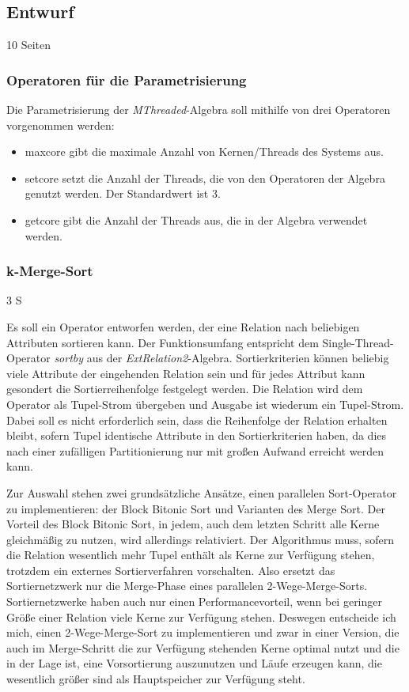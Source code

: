 \documentclass[a4paper,12pt,twoside]{article}
\newcommand{\Fb}[1]{\textit{#1}} %
\begin{document}
{\subsection{Entwurf} 10 Seiten
\label{Entwicklung} 

\subsubsection{Operatoren für die Parametrisierung}

Die Parametrisierung der \Fb{MThreaded}-Algebra soll mithilfe von drei Operatoren vorgenommen werden:

\begin{itemize}
	\item maxcore gibt die maximale Anzahl von Kernen/Threads des Systems aus.
	\item setcore setzt die Anzahl der Threads, die von den Operatoren der Algebra genutzt werden. Der Standardwert ist 3.
	\item getcore gibt die Anzahl der Threads aus, die in der Algebra verwendet werden.
\end{itemize}

\subsubsection{k-Merge-Sort} 3 S
\label{entw:sort}

Es soll ein Operator entworfen werden, der eine Relation nach beliebigen Attributen sortieren kann. Der Funktionsumfang entspricht dem Single-Thread-Operator \Fb{sortby} aus der \Fb{ExtRelation2}-Algebra. Sortierkriterien können beliebig viele Attribute der eingehenden Relation sein und für jedes Attribut kann gesondert die Sortierreihenfolge festgelegt werden. Die Relation wird dem Operator als Tupel-Strom übergeben und Ausgabe ist wiederum ein Tupel-Strom. Dabei soll es nicht erforderlich sein, dass die Reihenfolge der Relation erhalten bleibt, sofern Tupel identische Attribute in den Sortierkriterien haben, da dies nach einer zufälligen Partitionierung nur mit großen Aufwand erreicht werden kann.

Zur Auswahl stehen zwei grundsätzliche Ansätze, einen parallelen Sort-Operator zu implementieren: der Block Bitonic Sort und Varianten des Merge Sort. Der Vorteil des Block Bitonic Sort, in jedem, auch dem letzten Schritt alle Kerne gleichmäßig zu nutzen, wird allerdings relativiert. Der Algorithmus muss, sofern die Relation wesentlich mehr Tupel enthält als Kerne zur Verfügung stehen, trotzdem ein externes Sortierverfahren vorschalten. Also ersetzt das Sortiernetzwerk nur die Merge-Phase eines parallelen 2-Wege-Merge-Sorts. Sortiernetzwerke haben auch nur einen Performancevorteil, wenn bei geringer Größe einer Relation viele Kerne zur Verfügung stehen. Deswegen entscheide ich mich, einen 2-Wege-Merge-Sort zu implementieren und zwar in einer Version, die auch im Merge-Schritt die zur Verfügung stehenden Kerne optimal nutzt und die in der Lage ist, eine Vorsortierung auszunutzen und Läufe erzeugen kann, die wesentlich größer sind als Hauptspeicher zur Verfügung steht.

}
\end{document}

